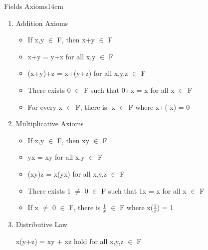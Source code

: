 	\begin{definition}{Fields Axioms}{14cm}
		\begin{enumerate}[label=(\alph*), leftmargin=0.5cm, itemsep=0.1cm]
			\item Addition Axioms
			
				\begin{itemize}[leftmargin=1cm, itemsep=0.1cm]
					\item If x,y $\in$ F, then x+y $\in$ F
				
					\item x+y = y+x for all x,y $\in$ F
				
					\item (x+y)+z = x+(y+z) for all x,y,z $\in$ F
				
					\item There exists 0 $\in$ F such that 0+x = x for all x $\in$ F
				
					\item For every x $\in$ F, there is -x $\in$ F where x+(-x) = 0
				\end{itemize}

			\item Multiplicative Axioms
			
				\begin{itemize}[leftmargin=1cm, itemsep=0.1cm]
					\item If x,y $\in$ F, then xy $\in$ F
				
					\item yx = xy for all x,y $\in$ F
				
					\item (xy)z = x(yx) for all x,y,z $\in$ F
				
					\item There exists 1 $\not =$ 0 $\in$ F such that
						1x = x for all x $\in$ F
				
					\item If x $\not =$ 0 $\in$ F, there is $\frac{1}{x}$ $\in$ F
						where x($\frac{1}{x}$) = 1
				\end{itemize}

			\item Distributive Law
			
				\hspace{0.5cm}
				x(y+z) = xy + xz hold for all x,y,z $\in$ F
		\end{enumerate}
	\end{definition}

	\vspace{0.5cm}



